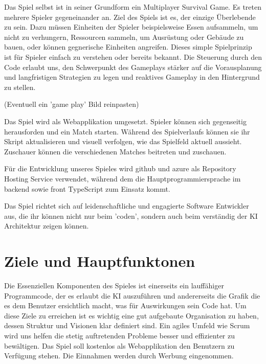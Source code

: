 \documentclass[a4paper, 11pt]{scrartcl}
\let\oldsection\section
\renewcommand\section{\clearpage\oldsection}
\begin{document}
Das Spiel selbst ist in seiner Grundform ein Multiplayer Survival Game.
Es treten mehrere Spieler gegeneinander an.
Ziel des Spiels ist es, der einzige Überlebende zu sein.
Dazu müssen Einheiten der Spieler beispielsweise Essen aufsammeln,
um nicht zu verhungern, Ressourcen sammeln, um Ausrüstung oder Gebäude zu bauen,
oder können gegnerische Einheiten angreifen.
Dieses simple Spielprinzip ist für Spieler einfach zu verstehen oder bereits bekannt.
Die Steuerung durch den Code erlaubt uns,
den Schwerpunkt des Gameplays stärker auf die Vorausplanung und langfristigen Strategien
zu legen und reaktives Gameplay in den Hintergrund zu stellen.

(Eventuell ein 'game play' Bild reinpasten)

Das Spiel wird als Webapplikation umgesetzt.
Spieler können sich gegenseitig herausforden und ein Match starten.
Während des Spielverlaufs können sie ihr Skript aktualisieren und visuell verfolgen,
wie das Spielfeld aktuell aussieht. Zuschauer können die verschiedenen Matches beitreten und zuschauen.

Für die Entwicklung unseres Spieles wird github und azure als Repository Hosting Service verwendet,
während dem die Hauptprogrammiersprache im backend sowie front TypeScript zum Einsatz kommt.

Das Spiel richtet sich auf leidenschaftliche und engagierte Software Entwickler aus,
die ihr können nicht nur beim 'coden', sondern auch beim verständig der KI Architektur zeigen können.

\section{Ziele und Hauptfunktonen}

Die Essenziellen Komponenten des Spieles ist einerseits ein lauffähiger Programmcode, der es erlaubt
die KI auszuführen und andererseits die Grafik die es dem Benutzer ersichtlich macht, was für Auswirkungen
sein Code hat.
Um diese Ziele zu erreichen ist es wichtig eine gut aufgebaute Organisation zu haben, dessen Struktur und
Visionen klar definiert sind. Ein agiles Umfeld wie Scrum wird uns helfen die stetig auftretenden Probleme
besser und effizienter zu bewältigen.
Das Spiel soll kostenlos als Webapplikation den Benutzern zu Verfügung stehen. Die Einnahmen werden
durch Werbung eingenommen.
\end{document}
